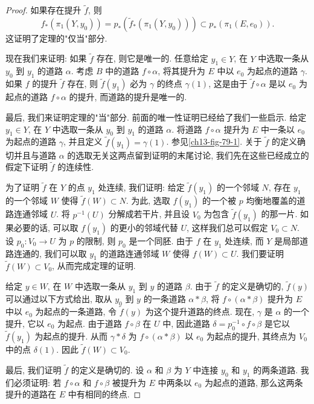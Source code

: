 \begin{proof}
如果存在提升 $\widetilde{f}$, 则
\[
f_{*}(\pi_{1}(Y,y_{0}))=p_{*}(\widetilde{f}_{*}(\pi_{1}(Y,y_{0})))\subset p_{*}(\pi_{1}(E,e_{0})).
\]
这证明了定理的"仅当"部分.

现在我们来证明: 如果 $\widetilde{f}$ 存在, 则它是唯一的. 任意给定 $y_{1}\in Y$, 在 $Y$ 中选取一条从 $y_{0}$ 到 $y_{1}$ 的道路 $\alpha$. 考虑 $B$ 中的道路 $f\circ\alpha$, 将其提升为 $E$ 中以 $e_{0}$ 为起点的道路 $\gamma$. 如果 $f$ 的提升 $\widetilde{f}$ 存在, 则 $\widetilde{f}(y_{1})$ 必为 $\gamma$ 的终点 $\gamma(1)$, 这是由于 $\widetilde{f}\circ\alpha$ 是以 $e_{0}$ 为起点的道路 $f\circ\alpha$ 的提升, 而道路的提升是唯一的.

最后, 我们来证明定理的"当"部分. 前面的唯一性证明已经给了我们一些启示. 给定 $y_{1}\in Y$, 在 $Y$ 中选取一条从 $y_{0}$ 到 $y_{1}$ 的道路 $\alpha$. 将道路 $f\circ\alpha$ 提升为 $E$ 中一条以 $e_{0}$ 为起点的道路 $\gamma$, 并且定义 $\widetilde{f}(y_{1})=\gamma(1)$. 参见\cref{ch13-fig-79-1}. 关于 $\widetilde{f}$ 的定义确切并且与道路 $\alpha$ 的选取无关这两点留到证明的末尾讨论, 我们先在这些已经成立的假定下证明 $\widetilde{f}$ 的连续性.


为了证明 $\widetilde{f}$ 在 $Y$ 的点 $y_{1}$ 处连续, 我们证明: 给定 $\widetilde{f}(y_{1})$ 的一个邻域 $N$, 存在 $y_{1}$ 的一个邻域 $W$ 使得 $\widetilde{f}(W)\subset N$. 为此, 选取 $f(y_{1})$ 的一个被 $p$ 均衡地覆盖的道路连通邻域 $U$. 将 $p^{-1}(U)$ 分解成若干片, 并且设 $V_{0}$ 为包含 $\widetilde{f}(y_{1})$ 的那一片. 如果必要的话, 可以取 $f(y_{1})$ 的更小的邻域代替 $U$, 这样我们总可以假定 $V_{0}\subset N$. 设 $p_{0}\colon V_{0}\to U$ 为 $p$ 的限制, 则 $p_{0}$ 是一个同胚. 由于 $f$ 在 $y_{1}$ 处连续, 而 $Y$ 是局部道路连通的, 我们可以取 $y_{1}$ 的道路连通邻域 $W$ 使得 $f(W)\subset U$. 我们要证明 $\widetilde{f}(W)\subset V_{0}$, 从而完成定理的证明.

给定 $y\in W$, 在 $W$ 中选取一条从 $y_{1}$ 到 $y$ 的道路 $\beta$. 由于 $\widetilde{f}$ 的定义是确切的, $\widetilde{f}(y)$ 可以通过以下方式给出, 取从 $y_{0}$ 到 $y$ 的一条道路 $\alpha*\beta$, 将 $f\circ(\alpha*\beta)$ 提升为 $E$ 中以 $e_{0}$ 为起点的一条道路, 令 $\widetilde{f}(y)$ 为这个提升道路的终点. 现在, $\gamma$ 是 $\alpha$ 的一个提升, 它以 $e_{0}$ 为起点. 由于道路 $f\circ\beta$ 在 $U$ 中, 因此道路 $\delta=p_{0}^{-1}\circ f\circ\beta$ 是它以 $\widetilde{f}(y_{1})$ 为起点的提升. 从而 $\gamma*\delta$ 为 $f\circ(\alpha*\beta)$ 以 $e_{0}$ 为起点的提升, 其终点为 $V_{0}$ 中的点 $\delta(1)$. 因此 $\widetilde{f}(W)\subset V_{0}$.

最后, 我们证明 $\widetilde{f}$ 的定义是确切的. 设 $\alpha$ 和 $\beta$ 为 $Y$ 中连接 $y_{0}$ 和 $y_{1}$ 的两条道路. 我们必须证明: 若 $f\circ\alpha$ 和 $f\circ\beta$ 被提升为 $E$ 中两条以 $e_{0}$ 为起点的道路, 那么这两条提升的道路在 $E$ 中有相同的终点.


\end{proof}
